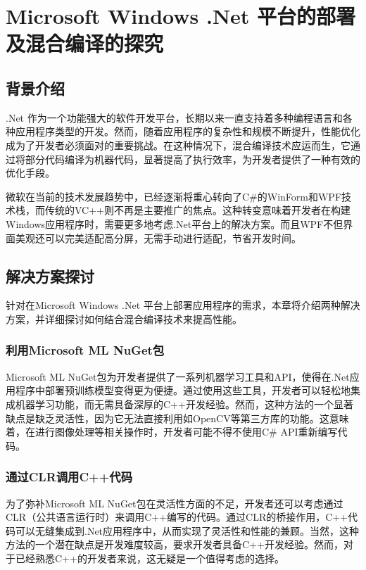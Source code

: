 \chapter{Microsoft Windows .Net 平台的部署及混合编译的探究}
\label{chapter:9dotnet}

\section{背景介绍}

.Net 作为一个功能强大的软件开发平台，长期以来一直支持着多种编程语言和各种应用程序类型的开发。然而，随着应用程序的复杂性和规模不断提升，性能优化成为了开发者必须面对的重要挑战。在这种情况下，混合编译技术应运而生，它通过将部分代码编译为机器代码，显著提高了执行效率，为开发者提供了一种有效的优化手段。

微软在当前的技术发展趋势中，已经逐渐将重心转向了C\#的WinForm和WPF技术栈，而传统的VC++则不再是主要推广的焦点。这种转变意味着开发者在构建Windows应用程序时，需要更多地考虑.Net平台上的解决方案。而且WPF不但界面美观还可以完美适配高分屏，无需手动进行适配，节省开发时间。

\section{解决方案探讨}

针对在Microsoft Windows .Net 平台上部署应用程序的需求，本章将介绍两种解决方案，并详细探讨如何结合混合编译技术来提高性能。

\subsection{利用Microsoft ML NuGet包}

Microsoft ML NuGet包为开发者提供了一系列机器学习工具和API，使得在.Net应用程序中部署预训练模型变得更为便捷。通过使用这些工具，开发者可以轻松地集成机器学习功能，而无需具备深厚的C++开发经验。然而，这种方法的一个显著缺点是缺乏灵活性，因为它无法直接利用如OpenCV等第三方库的功能。这意味着，在进行图像处理等相关操作时，开发者可能不得不使用C\# API重新编写代码。

\subsection{通过CLR调用C++代码}

为了弥补Microsoft ML NuGet包在灵活性方面的不足，开发者还可以考虑通过CLR（公共语言运行时）来调用C++编写的代码。通过CLR的桥接作用，C++代码可以无缝集成到.Net应用程序中，从而实现了灵活性和性能的兼顾。当然，这种方法的一个潜在缺点是开发难度较高，要求开发者具备C++开发经验。然而，对于已经熟悉C++的开发者来说，这无疑是一个值得考虑的选择。


